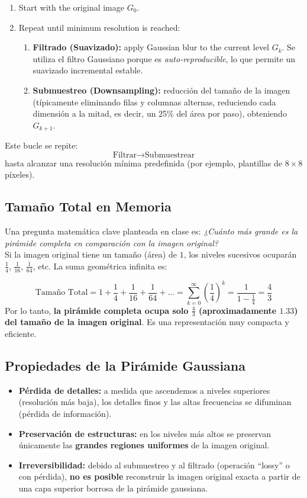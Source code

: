 \begin{enumerate}
    \item Start with the original image $G_0$.
    \item Repeat until minimum resolution is reached:
    \begin{enumerate}
        \item \textbf{Filtrado (Suavizado):}  apply Gaussian blur to the current level $G_k$. Se utiliza el filtro Gaussiano porque es \textit{auto-reproducible}, lo que permite un suavizado incremental estable.
        \item \textbf{Submuestreo (Downsampling):} reducción del tamaño de la imagen (típicamente eliminando filas y columnas alternas, reduciendo cada dimensión a la mitad, es decir, un 25\% del área por paso), obteniendo $G_{k+1}$.
    \end{enumerate}
\end{enumerate}
\noindent
Este bucle se repite:
$$\text{Filtrar} \longrightarrow \text{Submuestrear}$$
hasta alcanzar una resolución mínima predefinida (por ejemplo, plantillas de $8 \times 8$ píxeles).

\subsection{Tamaño Total en Memoria}
\noindent
Una pregunta matemática clave planteada en clase es: \textit{¿Cuánto más grande es la pirámide completa en comparación con la imagen original?} \\ 

\noindent
Si la imagen original tiene un tamaño (área) de $1$, los niveles sucesivos ocuparán $\frac{1}{4}$, $\frac{1}{16}$, $\frac{1}{64}$, etc. La suma geométrica infinita es:

$$\text{Tamaño Total} = 1 + \frac{1}{4} + \frac{1}{16} + \frac{1}{64} + \dots = \sum_{k=0}^{\infty} \left(\frac{1}{4}\right)^k = \frac{1}{1 - \frac{1}{4}} = \frac{4}{3}$$
Por lo tanto, \textbf{la pirámide completa ocupa solo $\frac{4}{3}$ (aproximadamente $1.33$) del tamaño de la imagen original}. Es una representación muy compacta y eficiente.

\subsection{Propiedades de la Pirámide Gaussiana}
\begin{itemize}
    \item \textbf{Pérdida de detalles:} a medida que ascendemos a niveles superiores (resolución más baja), los detalles finos y las altas frecuencias se difuminan (pérdida de información).
    \item \textbf{Preservación de estructuras:} en los niveles más altos se preservan únicamente las \textbf{grandes regiones uniformes} de la imagen original.
    \item \textbf{Irreversibilidad:} debido al submuestreo y al filtrado (operación ``lossy'' o con pérdida), \textbf{no es posible} reconstruir la imagen original exacta a partir de una capa superior borrosa de la pirámide gaussiana.
\end{itemize}

